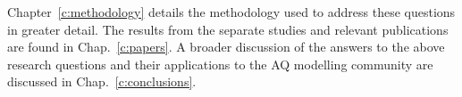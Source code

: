 Chapter~\ref{c:methodology} details the methodology used to address these questions in greater detail.
The results from the separate studies and relevant publications are found in Chap.~\ref{c:papers}.
A broader discussion of the answers to the above research questions and their applications to the AQ modelling community are discussed in Chap.~\ref{c:conclusions}.

